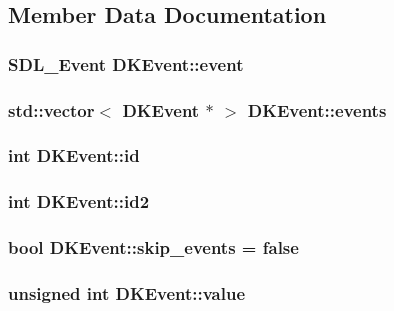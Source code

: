 \subsection{Member Data Documentation}
\hypertarget{class_d_k_event_a3deebb932ed734363c4ece87971bc45f}{
\subsubsection[{event}]{\setlength{\rightskip}{0pt plus 5cm}S\-D\-L\-\_\-\-Event D\-K\-Event\-::event}}\label{class_d_k_event_a3deebb932ed734363c4ece87971bc45f}
\hypertarget{class_d_k_event_acaded8543ecfb42f8aabefd848af0b9a}{
\subsubsection[{events}]{\setlength{\rightskip}{0pt plus 5cm}std\-::vector$<$ {\bf D\-K\-Event} $\ast$ $>$ D\-K\-Event\-::events\hspace{0.3cm}{\ttfamily [static]}}}\label{class_d_k_event_acaded8543ecfb42f8aabefd848af0b9a}
\hypertarget{class_d_k_event_a46877918e12fcb3b2c8988379b6fa6fa}{
\subsubsection[{id}]{\setlength{\rightskip}{0pt plus 5cm}int D\-K\-Event\-::id}}\label{class_d_k_event_a46877918e12fcb3b2c8988379b6fa6fa}
\hypertarget{class_d_k_event_adf258ac2b7c2177a828c6d6aae3890e1}{
\subsubsection[{id2}]{\setlength{\rightskip}{0pt plus 5cm}int D\-K\-Event\-::id2}}\label{class_d_k_event_adf258ac2b7c2177a828c6d6aae3890e1}
\hypertarget{class_d_k_event_aef512bb7dbdaf129bdc0cf428d2c2bd9}{
\subsubsection[{skip\-\_\-events}]{\setlength{\rightskip}{0pt plus 5cm}bool D\-K\-Event\-::skip\-\_\-events = false\hspace{0.3cm}{\ttfamily [static]}}}\label{class_d_k_event_aef512bb7dbdaf129bdc0cf428d2c2bd9}
\hypertarget{class_d_k_event_ad69b28a679f94465013c7556de75ace8}{
\subsubsection[{value}]{\setlength{\rightskip}{0pt plus 5cm}unsigned int D\-K\-Event\-::value}}\label{class_d_k_event_ad69b28a679f94465013c7556de75ace8}


